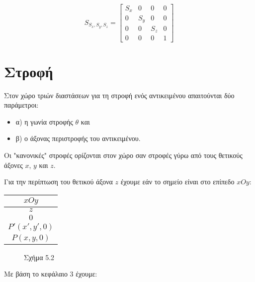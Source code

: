 

\[
S_{S_x,S_y,S_z} = 
\begin{bmatrix}
S_x & 0 & 0 & 0 \\
0 & S_y & 0 & 0 \\
0 & 0 & S_z & 0 \\
0 & 0 & 0 & 1
\end{bmatrix}
\]

\section{Στροφή}

Στον χώρο τριών διαστάσεων για τη στροφή ενός αντικειμένου απαιτούνται δύο παράμετροι:

\begin{itemize}
    \item α) η γωνία στροφής $\theta$ και
    \item β) ο άξονας περιστροφής του αντικειμένου.
\end{itemize}

Οι "κανονικές" στροφές ορίζονται στον χώρο σαν στροφές γύρω από τους θετικούς άξονες $x$, $y$ και $z$.

Για την περίπτωση του θετικού άξονα $z$ έχουμε εάν το σημείο είναι στο επίπεδο $xOy$:

\begin{center}
\begin{tabular}{c}
$xOy$ \\
\hline
$z$ \\
$0$ \\
$P' (x', y', 0)$ \\
$P (x, y, 0)$ \\
\end{tabular}
\end{center}

\begin{figure}[h]
\centering
\caption{Σχήμα 5.2}
\end{figure}

Με βάση το κεφάλαιο 3 έχουμε:

